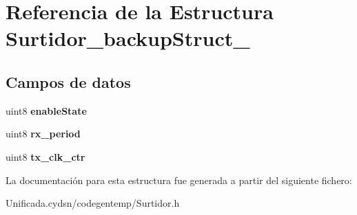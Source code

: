 \hypertarget{struct_surtidor__backup_struct__}{}\section{Referencia de la Estructura Surtidor\+\_\+backup\+Struct\+\_\+}
\label{struct_surtidor__backup_struct__}
\subsection*{Campos de datos}
\begin{DoxyCompactItemize}
\item 
\mbox{\label{struct_surtidor__backup_struct___a0d9eac82e0d9647810c46a0da6e36302}} 
uint8 {\bfseries enable\+State}
\item 
\mbox{\label{struct_surtidor__backup_struct___ae3d4a93a1533c2c9d210fe52c0d0d387}} 
uint8 {\bfseries rx\+\_\+period}
\item 
\mbox{\label{struct_surtidor__backup_struct___a122d7b41973eb1a1e80482af3f40a9fe}} 
uint8 {\bfseries tx\+\_\+clk\+\_\+ctr}
\end{DoxyCompactItemize}


La documentación para esta estructura fue generada a partir del siguiente fichero\+:\begin{DoxyCompactItemize}
\item 
Unificada.\+cydsn/codegentemp/Surtidor.\+h\end{DoxyCompactItemize}
